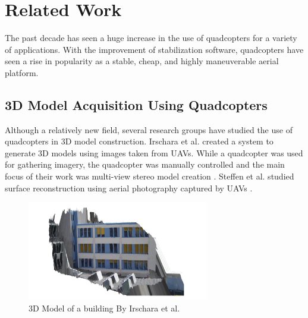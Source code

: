 
\chapter{Related Work\label{ch:pastwork}}

The past decade has seen a huge increase in the use of quadcopters for a variety of applications. With the improvement of stabilization software, quadcopters have seen a rise in popularity as a stable, cheap, and highly maneuverable aerial platform. 

\section{3D Model Acquisition Using Quadcopters}

	Although a relatively new field, several research groups have studied the use of quadcopters in 3D model construction. Irschara et al. created a system to generate 3D models using images taken from UAVs. While a quadcopter was used for gathering imagery, the quadcopter was manually controlled and the main focus of their work was multi-view stereo model creation \cite{Irschara}. Steffen et al. studied surface reconstruction using aerial photography captured by UAVs \cite{Steffen}.

	 \begin{figure}[ht]
            \centering
            \includegraphics[width=300px]{../images/Irschara.png}
            \caption{3D Model of a building By Irschara et al.~\cite{Irschara}}\label{fig:Irschara}
    \end{figure}

